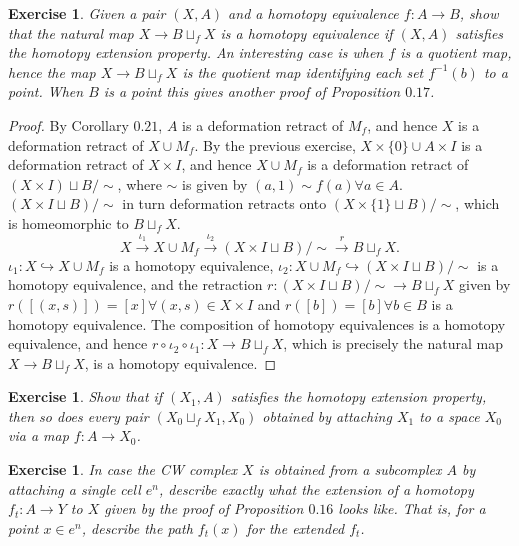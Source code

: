 \documentclass{article}
\newtheorem{exercise}[theorem]{Exercise}
\begin{document}
\begin{exercise}
Given a pair $(X,A)$ and a homotopy equivalence $f:A\to B$, show that the natural map $X\to B\sqcup_fX$ is a homotopy equivalence if $(X,A)$ satisfies the homotopy extension property. An interesting case is when $f$ is a quotient map, hence the map $X\to B\sqcup_f X$ is the quotient map identifying each set $f^{-1}(b)$ to a point. When $B$ is a point this gives another proof of Proposition $0.17$.
\end{exercise}
\begin{proof}
By Corollary $0.21$, $A$ is a deformation retract of $M_f$, and hence $X$ is a deformation retract of $X\cup M_f$. By the previous exercise, $X\times\{0\}\cup A\times I$ is a deformation retract of $X\times I$, and hence $X\cup M_f$ is a deformation retract of $(X\times I)\sqcup B/\sim$, where $\sim$ is given by $(a,1)\sim f(a)\forall a\in A$. $(X\times I\sqcup B)/\sim$ in turn deformation retracts onto $(X\times\{1\}\sqcup B)/\sim$, which is homeomorphic to $B\sqcup_fX$.\[X\overset{\iota_1}{\longrightarrow} X\cup M_f\overset{\iota_2}{\longrightarrow} (X\times I\sqcup B)/\sim\overset{r}{\longrightarrow} B\sqcup_fX.\] $\iota_1:X\hookrightarrow X\cup M_f$ is a homotopy equivalence, $\iota_2:X\cup M_f\hookrightarrow (X\times I\sqcup B)/\sim$ is a homotopy equivalence, and the retraction $r:(X\times I\sqcup B)/\sim\to B\sqcup _fX$ given by $r([(x,s)])=[x]\forall (x,s)\in X\times I$ and $r([b])=[b]\forall b\in B$ is a homotopy equivalence. The composition of homotopy equivalences is a homotopy equivalence, and hence $r\circ \iota_2\circ\iota_1:X\to B\sqcup_fX$, which is precisely the natural map $X\to B\sqcup_fX$, is a homotopy equivalence.
\end{proof}

\begin{exercise}
Show that if $(X_1,A)$ satisfies the homotopy extension property, then so does every pair $(X_0\sqcup_fX_1,X_0)$ obtained by attaching $X_1$ to a space $X_0$ via a map $f:A\to X_0$.
\end{exercise}

\begin{exercise}
In case the CW complex $X$ is obtained from a subcomplex $A$ by attaching a single cell $e^n$, describe exactly what the extension of a homotopy $f_t:A\to Y$ to $X$ given by the proof of Proposition $0.16$ looks like. That is, for a point $x\in e^n$, describe the path $f_t(x)$ for the extended $f_t$.
\end{exercise}
\end{document}
